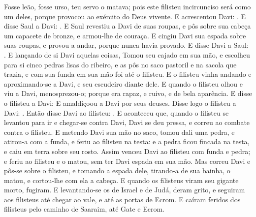 {{  Fosse leão, fosse urso, teu servo o matava; pois este filisteu incircunciso será como um deles, porque provocou ao exército do Deus vivente}.
  E acrescentou Davi: . E disse Saul a Davi: .
  E Saul revestiu a Davi de suas roupas, e pôs sobre sua cabeça um capacete de bronze, e armou-lhe de couraça.
  E cingiu Davi sua espada sobre suas roupas, e provou a andar, porque nunca havia provado. E disse Davi a Saul: . E lançando de si Davi aquelas coisas,
  Tomou seu cajado em sua mão, e escolheu para si cinco pedras lisas do ribeiro, e as pôs no saco pastoril e na sacola que trazia, e com sua funda em sua mão foi até o filisteu.
  E o filisteu vinha andando e aproximando-se a Davi, e seu escudeiro diante dele.
  E quando o filisteu olhou e viu a Davi, menosprezou-o; porque era rapaz, e ruivo, e de bela aparência.
  E disse o filisteu a Davi:  E amaldiçoou a Davi por seus deuses.
  Disse logo o filisteu a Davi: .
  Então disse Davi ao filisteu: . %
  E aconteceu que, quando o filisteu se levantou para ir e chegar-se contra Davi, Davi se deu pressa, e correu ao combate contra o filisteu.
  E metendo Davi sua mão no saco, tomou dali uma pedra, e atirou-a com a funda, e feriu ao filisteu na testa: e a pedra ficou fincada na testa, e caiu em terra sobre seu rosto.
  Assim venceu Davi ao filisteu com funda e pedra; e feriu ao filisteu e o matou, sem ter Davi espada em sua mão.
  Mas correu Davi e pôs-se sobre o filisteu, e tomando a espada dele, tirando-a de sua bainha, o matou, e cortou-lhe com ela a cabeça. E quando os filisteus viram seu gigante morto, fugiram.
  E levantando-se os de Israel e de Judá, deram grito, e seguiram aos filisteus até chegar ao vale, e até as portas de Ecrom. E caíram feridos dos filisteus pelo caminho de Saaraim, até Gate e Ecrom.
}
